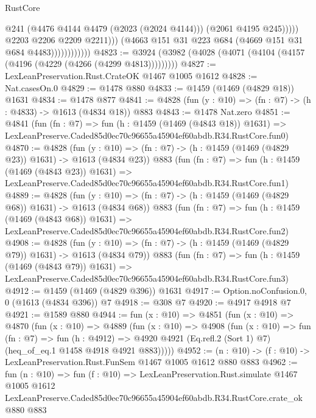 \begin{lexlean}{RustCore}
\begin{coremodule}
                                      @241
                                      (@4476 @4144 @4479 (@2023 (@2024 @4144)))
                                      (@2061 @4195 @245)))))
                              @2203
                              @2206
                              @2209
                              @2211)))
                        (@4663 @151 @31 @223 @684 (@4669 @151 @31 @684 @4483))))))))))))
@4823 := @3924 (@3982 (@4028 (@4071 (@4104 (@4157 (@4196 (@4229 (@4266 (@4299 @4813)))))))))
@4827 := LexLeanPreservation.Rust.CrateOK @1467 @1005 @1612
@4828 := Nat.casesOn.{0}
@4829 := @1478 @880
@4833 := @1459 (@1469 (@4829 @18)) @1631
@4834 := @1478 @877
@4841 := @4828 (fun (y : @10) => (fn : @7) -> (h : @4833) -> @1613 (@4834 @18)) @883
@4843 := @1478 Nat.zero
@4851 := @4841
    (fun (fn : @7) =>
    fun (h : @1459 (@1469 (@4843 @18)) @1631) =>
    LexLeanPreserve.Caded85d0ec70c96655a45904ef60abdb.R34.RustCore.fun0)
@4870 := @4828
    (fun (y : @10) => (fn : @7) -> (h : @1459 (@1469 (@4829 @23)) @1631) -> @1613 (@4834 @23))
    @883
    (fun (fn : @7) =>
    fun (h : @1459 (@1469 (@4843 @23)) @1631) =>
    LexLeanPreserve.Caded85d0ec70c96655a45904ef60abdb.R34.RustCore.fun1)
@4889 := @4828
    (fun (y : @10) => (fn : @7) -> (h : @1459 (@1469 (@4829 @68)) @1631) -> @1613 (@4834 @68))
    @883
    (fun (fn : @7) =>
    fun (h : @1459 (@1469 (@4843 @68)) @1631) =>
    LexLeanPreserve.Caded85d0ec70c96655a45904ef60abdb.R34.RustCore.fun2)
@4908 := @4828
    (fun (y : @10) => (fn : @7) -> (h : @1459 (@1469 (@4829 @79)) @1631) -> @1613 (@4834 @79))
    @883
    (fun (fn : @7) =>
    fun (h : @1459 (@1469 (@4843 @79)) @1631) =>
    LexLeanPreserve.Caded85d0ec70c96655a45904ef60abdb.R34.RustCore.fun3)
@4912 := @1459 (@1469 (@4829 @396)) @1631
@4917 := Option.noConfusion.{0, 0} (@1613 (@4834 @396)) @7
@4918 := @308 @7
@4920 := @4917 @4918 @7
@4921 := @1589 @880
@4944 := fun (x : @10) =>
  @4851
    (fun (x : @10) =>
    @4870
      (fun (x : @10) =>
      @4889
        (fun (x : @10) =>
        @4908
          (fun (x : @10) =>
          fun (fn : @7) =>
          fun (h : @4912) =>
          @4920 @4921 (Eq.refl.{2} (Sort 1) @7) (heq_of_eq.{1} @1458 @4918 @4921 @883)))))
@4952 := (n : @10) -> (f : @10) -> LexLeanPreservation.Rust.FunSem @1467 @1005 @1612 @880 @883
@4962 := fun (n : @10) =>
  fun (f : @10) =>
  LexLeanPreservation.Rust.simulate
    @1467
    @1005
    @1612
    LexLeanPreserve.Caded85d0ec70c96655a45904ef60abdb.R34.RustCore.crate_ok
    @880
    @883
\end{coremodule}
\end{lexlean}
